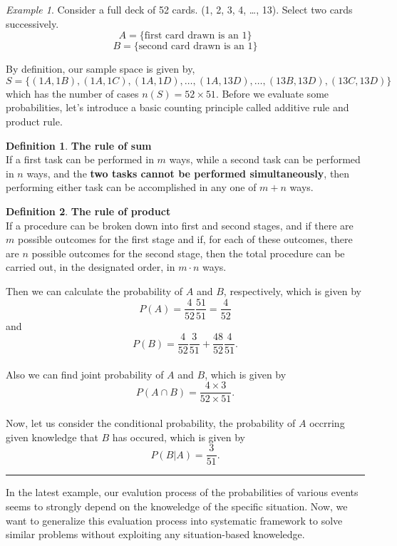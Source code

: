 \documentclass[twoside]{article}
\newcounter{lecnum}
\theoremstyle{definition}
\newtheorem{definition}{Definition}[section]
\theoremstyle{remark}
\newtheorem{example}{Example}[lecnum]
\newenvironment{sol}{{\bf Solution:}}{\hfill\rule{2mm}{2mm}}
\begin{document}
\begin{example}
  Consider a full deck of 52 cards. (1, 2, 3, 4, \ldots, 13). Select two cards
  successively.
  $$ A = \{ \textrm{first card drawn is an 1} \} $$
  $$ B = \{ \textrm{second card drawn is an 1} \} $$

  \begin{sol}
    By definition, our sample space is given by,
    $$
    S = \{ (1A,1B), (1A,1C), (1A, 1D), \ldots, (1A, 13D), \ldots, (13B, 13D), (13C, 13D) \}
    $$
    which has the number of cases $n(S) = 52 \times 51$. Before we evaluate some
    probabilities, let's introduce a basic counting principle called additive rule
    and product rule.

    \begin{definition}
      {\bf The rule of sum} \\
      If a first task can be performed in $m$ ways, while a second task can be performed
      in $n$ ways, and the \textbf{two tasks cannot be performed simultaneously}, then
      performing either task can be accomplished in any one of $m+n$ ways.
    \end{definition}
    \begin{definition}
      {\bf The rule of product} \\
      If a procedure can be broken down into first and second stages, and if there are
      $m$ possible outcomes for the first stage and if, for each of these outcomes,
      there are $n$ possible outcomes for the second stage, then the total procedure can
      be carried out, in the designated order, in $m \cdot n$ ways.
    \end{definition}

    Then we can calculate the
    probability of $A$ and $B$, respectively, which is given by
    $$
    P(A) = \frac{4}{52} \frac{51}{51} = \frac{4}{52}
    $$
    and
    $$
    P(B) = \frac{4}{52} \frac{3}{51} + \frac{48}{52} \frac{4}{51}.
    $$
    \\[1.5\baselineskip]
    Also we can find joint probability of $A$ and $B$, which is given by
    $$
    P(A \cap B) = \frac{4 \times 3}{52 \times 51}.
    $$
    \\[1.5\baselineskip]
    Now, let us consider the conditional probability, the probability of $A$ occrring
    given knowledge that $B$ has occured, which is given by
    $$
    P(B|A) = \frac{3}{51}.
    $$
  \end{sol}
\end{example}

In the latest example, our evalution process of the probabilities of various events
seems to strongly depend on the knoweledge of the specific situation. Now, we
want to generalize this evaluation process into systematic framework to solve
similar problems without exploiting any situation-based knoweledge.
\end{document}
